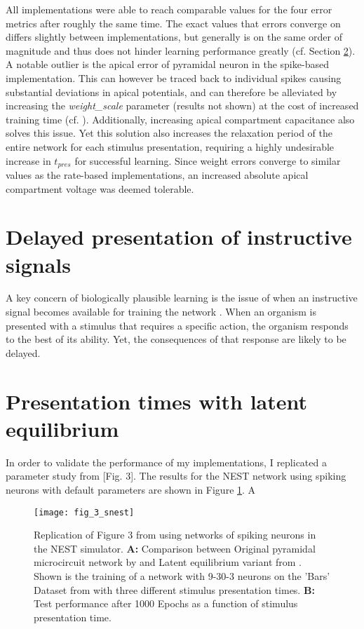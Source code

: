 All implementations were able to reach comparable values for the four error metrics after roughly the same time. The
exact values that errors converge on differs slightly between implementations, but generally is on the same order of
magnitude and thus does not hinder learning performance greatly (cf. Section \ref{sec-le-tpres}). A notable outlier is
the apical error of pyramidal neuron in the spike-based implementation. This can however be traced back to individual
spikes causing substantial deviations in apical potentials, and can therefore be alleviated by increasing the
\textit{weight\_scale} parameter (results not shown) at the cost of increased training time (cf. ).
Additionally, increasing apical compartment capacitance also solves this issue. Yet this solution also increases the
relaxation period of the entire network for each stimulus presentation, requiring a highly undesirable increase in
$t_{pres}$ for successful learning. Since weight errors converge to similar values as the rate-based implementations, an
increased absolute apical compartment voltage was deemed tolerable.

\section{Delayed presentation of instructive signals}

A key concern of biologically plausible learning is the issue of when an instructive signal becomes available for
training the network . When an organism is presented with a stimulus that requires a specific action,
the organism responds to the best of its ability. Yet, the consequences of that response are likely to be delayed.


\section{Presentation times with latent equilibrium}\label{sec-le-tpres}

In order to validate the performance of my implementations, I replicated a parameter study from \cite{Haider2021}[Fig.
    3]. The results for the NEST network using spiking neurons with default parameters  are
    shown in Figure \ref{fig-bars-le-snest}. A



\begin{figure}[t]
    \centering
    \texttt{[image: fig\_3\_snest]}
    \caption{Replication of Figure 3 from \cite{Haider2021} using networks of spiking neurons in the NEST simulator.
        \textbf{A:} Comparison between Original pyramidal microcircuit network by \cite{sacramento2018dendritic} and
        Latent equilibrium variant from \cite{Haider2021}. Shown is the training of a network with 9-30-3 neurons on the
        'Bars' Dataset from  with three different stimulus presentation times. \textbf{B:} Test
        performance after 1000 Epochs as a function of stimulus presentation time.}
    \label{fig-bars-le-snest}
\end{figure}




